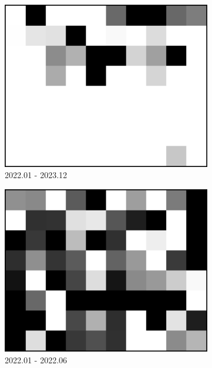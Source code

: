 \documentclass[a4paper,fleqn]{cas-sc}
\begin{document}
\begin{figure}
\begin{subfigure}{0.3\textwidth}
        \centering
        \includegraphics[width=\textwidth]{figure/The azimuth shift/shift_Milan_des_20231222.png}
        \caption{2022.01 - 2023.12}
        \label{fig_7f}
    \end{subfigure}
        \begin{subfigure}{0.3\textwidth}
        \centering
        \includegraphics[width=\textwidth]{figure/The azimuth shift/shift_TaklimakanDesert_asc_20220624.png}
        \caption{2022.01 - 2022.06}
        \label{fig_7j}
    \end{subfigure}
    \begin{subfigure}{0.3\textwidth}

\end{subfigure}
\end{figure}
\end{document}
